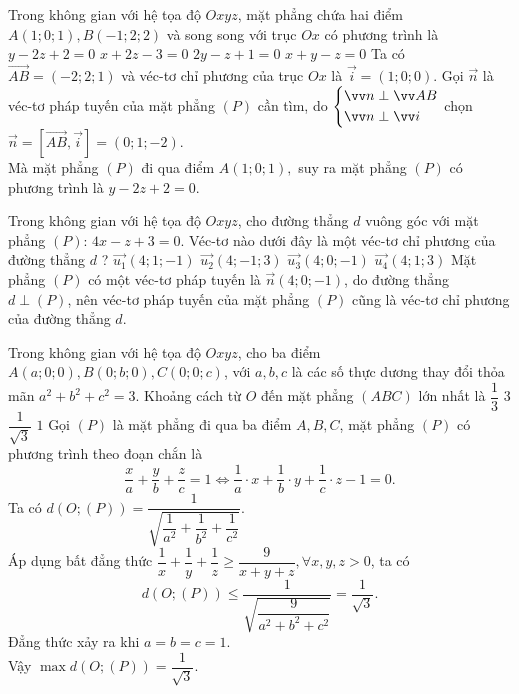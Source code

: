 \begin{ex}%
Trong không gian với hệ tọa độ $Oxyz$, mặt phẳng chứa hai điểm  $A(1;0;1), B(-1;2;2)$ và song song với trục $Ox$ có phương trình là
\choice
{\True $y-2z+2=0$}
{$x+2z-3=0$}
{$2y-z+1=0$}
{$x+y-z=0$}
\loigiai
{ Ta có $\vec{AB} =(-2;2;1)$ và véc-tơ chỉ phương của trục $Ox$ là $\vec{i}=(1;0;0)$.
Gọi $ \vec{n}$ là véc-tơ pháp tuyến của mặt phẳng $(P)$ cần tìm, do $ \heva{& \vec{n} \perp \vec{AB}\\& \vec{n} \perp \vec{i}}$ chọn $ \vec{n} = \left[ \vec{AB}, \vec{i}\right] = (0;1;-2).$\\
Mà mặt phẳng $(P)$ đi qua điểm $A(1;0;1),$ suy ra mặt phẳng $(P)$ có phương trình là $y-2z+2=0$.
}
\end{ex}
\begin{ex}%
Trong không gian với hệ tọa độ $Oxyz$, cho đường thẳng $d$ vuông góc với mặt phẳng $(P)$: $4x-z+3=0.$ Véc-tơ nào dưới đây là một véc-tơ chỉ phương của đường thẳng $d$ ?
\choice
{$ \vec{u_1}(4;1;-1)$}
{$\vec{u_2}(4;-1;3)$}
{\True $\vec{u_3}(4;0;-1)$}
{$\vec{u_4}(4;1;3)$}
\loigiai
{ Mặt phẳng $(P)$ có một véc-tơ pháp tuyến là $\vec{n}(4;0;-1)$, do đường thẳng $d \perp (P)$, nên véc-tơ pháp tuyến của mặt phẳng $(P)$ cũng là véc-tơ chỉ phương của đường thẳng $d.$ 
}
\end{ex}
\begin{ex}%
Trong không gian với hệ tọa độ $Oxyz$, cho ba điểm $A(a;0;0), B(0;b;0), C(0;0;c)$, với $a, b, c$ là các số thực dương thay đổi thỏa mãn $a^2+b^2+c^2=3$. Khoảng cách từ $O$ đến mặt phẳng $(ABC)$ lớn nhất là
\choice
{$\dfrac{1}{3}$}
{$3$}
{\True $\dfrac{1}{\sqrt{3}}$}
{$1$}
\loigiai
{ Gọi $(P)$ là mặt phẳng đi qua ba điểm $A, B, C$, mặt phẳng $(P)$ có phương trình theo đoạn chắn là $$\dfrac{x}{a}+\dfrac{y}{b}+\dfrac{z}{c}=1 \Leftrightarrow \dfrac{1}{a} \cdot x + \dfrac{1}{b} \cdot y +\dfrac{1}{c} \cdot z -1=0.$$
Ta có $d(O;(P))= \dfrac{1}{\sqrt{ \dfrac{1}{a^2}+\dfrac{1}{b^2}+\dfrac{1}{c^2}}}.$\\
Áp dụng bất đẳng thức $\dfrac{1}{x}+\dfrac{1}{y}+\dfrac{1}{z} \geq \dfrac{9}{x+y+z},  \forall x,y, z>0$, ta có \\
$$d(O;(P)) \leq \dfrac{1}{\sqrt{ \dfrac{9}{a^2+b^2+c^2}}}=\dfrac{1}{\sqrt{3}}.$$ Đẳng thức xảy ra khi $a=b=c=1.$\\
Vậy $\max d(O;(P))= \dfrac{1}{\sqrt{3}}.$
}
\end{ex}
